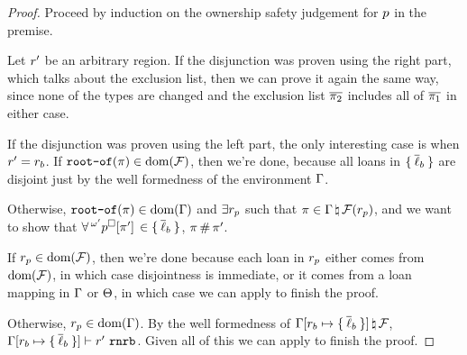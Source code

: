 \begin{proof}
  Proceed by induction on the ownership safety judgement for $p$ in
  the premise.
 
  \vspace{1em}
  \noindent \framebox[\textwidth]{ \figuresize
    \begin{mathpar}
      \OSafePlace
    \end{mathpar}
  } \vspace{1em}

  Let $r^\prime$ be an arbitrary region. If the disjunction was proven
  using the right part, which talks about the exclusion list, then we can prove
  it again the same way, since none of the types are changed and the exclusion
  list $\overline{\pi_2}$ includes all of $\overline{\pi_1}$ in either case.

  If the disjunction was proven using the left part, the only interesting case
  is when $r^\prime = r_b$. If $\texttt{root-of}(\pi) \in \textrm{dom}(\mathcal{F})$,
  then we're done, because all loans in $\{ \: \overline{\ell}_b \: \}$ are disjoint just
  by the well formedness of the environment $\Gamma$.

  Otherwise, $\texttt{root-of}(\pi) \in \textrm{dom}(\Gamma)$ and $\exists
  r_p$ such that $\pi \in
  \Gamma \, \natural \, \mathcal{F}(r_p)$, and we want to show that
  $\forall \,^{\omega^\prime}p^\square[\pi^\prime]\, \in
  \{ \: \overline{\ell}_b \: \}$, $\pi \, \# \, \pi^\prime$.

  If $r_p \in \textrm{dom}(\mathcal{F})$, then we're done because each loan in
  $r_p$ either comes from $\textrm{dom}(\mathcal{F})$, in which case
  disjointness is immediate, or it comes from a loan mapping in $\Gamma$ or
  $\Theta$, in which case we can apply
   to finish the proof.

  Otherwise, $r_p \in \textrm{dom}(\Gamma)$. By the well formedness 
  of $\Gamma[r_b \mapsto \{ \: \overline{\ell}_b \: \}] \, \natural \, \mathcal{F}$,
  $\Gamma[r_b \mapsto
      \{ \: \overline{\ell}_b \: \}] \vdash r^\prime \ \mathtt{rnrb}$. Given all of this we can apply
   to finish the proof.

  \vspace{1em}
  \noindent \framebox[\textwidth]{ \figuresize
    \begin{mathpar}
      \ODeref
    \end{mathpar}
  } \vspace{1em}


\end{proof}
